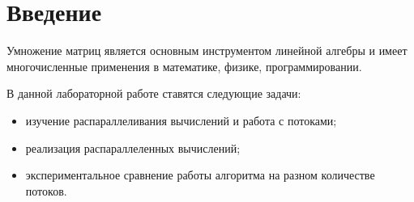 \chapter*{Введение}


Умножение матриц является основным инструментом линейной алгебры и имеет многочисленные применения в математике, физике, программировании.

В данной лабораторной работе ставятся следующие задачи:

\begin{itemize}
	\item изучение распараллеливания вычислений и работа с потоками;
	\item реализация распараллеленных вычислений;
	\item экспериментальное сравнение работы алгоритма на разном количестве потоков.
\end{itemize}
